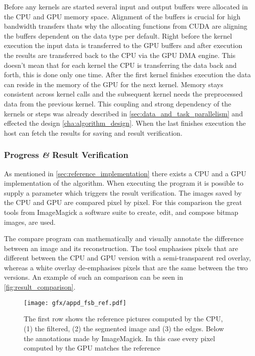Before any kernels are started several input and output buffers were allocated
in the \gls{CPU} and \gls{GPU} memory space. Alignment of the buffers is
crucial for high bandwidth transfers thats why the allocating functions from
\gls{CUDA} are aligning the buffers dependent on the data type per default.
Right before the kernel execution the input data is transferred to the \gls{GPU}
buffers and after execution the results are transferred back to the \gls{CPU}
via the \gls{GPU} \gls{DMA} engine. This doesn't mean that for each kernel the
\gls{CPU} is transferring the data back and forth, this is done only one time.
After the first kernel finishes execution the data can reside in the memory of
the \gls{GPU} for the next kernel. Memory stays consistent across kernel calls
and the subsequent kernel needs the preprocessed data from the previous kernel.
This coupling and strong dependency of the kernels or steps was already
described in \autoref{sec:data_and_task_parallelism} and effected the design
\autoref{cha:algorithm_design}. When the last finishes execution the
host can fetch the results for saving and result verification. 

\subsubsection{Progress \textit{\&} Result Verification} %
\label{ssub:progress_result_verificationcation}
As mentioned in \autoref{sec:reference_implementation} there exists a \gls{CPU}
and a \gls{GPU} implementation of the algorithm. When executing the program
it is possible to supply a parameter which triggers the result verification. The
images saved by the \gls{CPU} and \gls{GPU} are compared pixel by pixel. For 
this comparison the great tools from ImageMagick a software suite to 
create, edit, and compose bitmap images, are used. 

The compare program can mathematically and visually annotate the difference 
between an image and its reconstruction. The tool emphasises pixels that are 
different between the \gls{CPU} and \gls{GPU} version with a semi-transparent red
overlay, whereas a white overlay de-emphasises pixels that are the same between
the two versions. An example of such an comparison can be seen in 
\autoref{fig:result_comparison}.

\begin{figure}[ht]
  \centering
 	\texttt{[image: gfx/appd\_fsb\_ref.pdf]}
  \caption{The first row shows the reference pictures
	computed by the \protect\gls{CPU}, (1) the filtered, (2) the segmented image 
	and (3) the edges. Below the annotations made by ImageMagick. In this case
	every pixel computed by the \protect\gls{GPU} matches the reference}
  \label{fig:result_comparison}
\end{figure}

